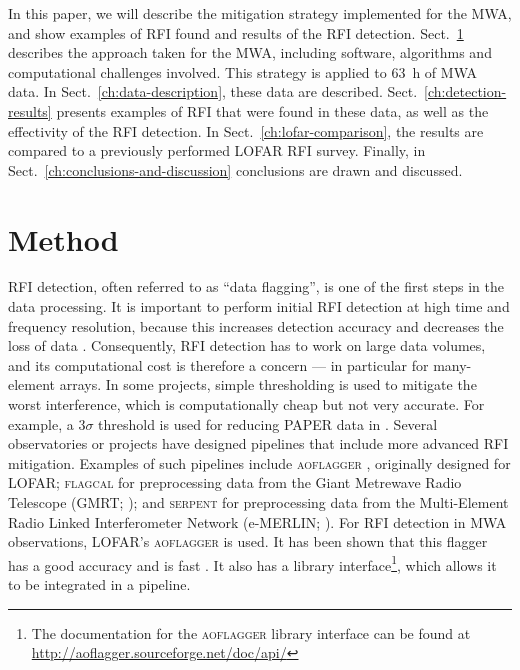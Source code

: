 \documentclass{pasa}
\begin{document}
In this paper, we will describe the mitigation strategy implemented for the MWA, and show examples of RFI found and results of the RFI detection. Sect.~\ref{ch:method} describes the approach taken for the MWA, including software, algorithms and computational challenges involved. This strategy is applied to 63~h of MWA data. In Sect.~\ref{ch:data-description}, these data are described. Sect.~\ref{ch:detection-results} presents examples of RFI that were found in these data, as well as the effectivity of the RFI detection. In Sect.~\ref{ch:lofar-comparison}, the results are compared to a previously performed LOFAR RFI survey. Finally, in Sect.~\ref{ch:conclusions-and-discussion} conclusions are drawn and discussed.

\section{Method} \label{ch:method}
RFI detection, often referred to as ``data flagging'', is one of the first steps in the data processing. It is important to perform initial RFI detection at high time and frequency resolution, because this increases detection accuracy and decreases the loss of data . Consequently, RFI detection has to work on large data volumes, and its computational cost is therefore a concern --- in particular for many-element arrays. In some projects, simple thresholding is used to mitigate the worst interference, which is computationally cheap but not very accurate. For example, a $3\sigma$ threshold is used for reducing PAPER data in \citet{parsons-paper-eorlimit-2014}. Several observatories or projects have designed pipelines that include more advanced RFI mitigation. Examples of such pipelines include \textsc{aoflagger} \citep{post-correlation-rfi-classification,scale-invariant-rank-operator}, originally designed for LOFAR; \textsc{flagcal} for preprocessing data from the Giant Metrewave Radio Telescope (GMRT; \citealt{prasad-flagcal-2012}); and \textsc{serpent} for preprocessing data from the Multi-Element Radio Linked Interferometer Network (e-MERLIN; \citealt{serpent-peck-2013}). For RFI detection in MWA observations, LOFAR's \textsc{aoflagger} is used. It has been shown that this flagger has a good accuracy and is fast . It also has a library interface\footnote{The documentation for the \textsc{aoflagger} library interface can be found at \url{http://aoflagger.sourceforge.net/doc/api/}}, which allows it to be integrated in a pipeline.
\end{document}
